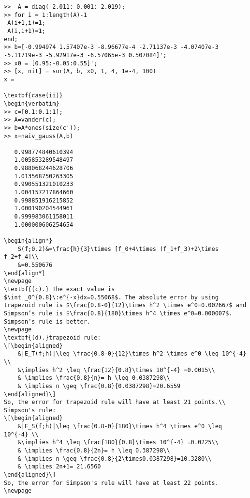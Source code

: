 \begin{verbatim}
>>  A = diag(-2.011:-0.001:-2.019);
>> for i = 1:length(A)-1
 A(i+1,i)=1;
 A(i,i+1)=1;
end;
>> b=[-0.994974 1.57407e-3 -8.96677e-4 -2.71137e-3 -4.07407e-3 -5.11719e-3 -5.92917e-3 -6.57065e-3 0.507084]';
>> x0 = [0.95:-0.05:0.55]';
>> [x, nit] = sor(A, b, x0, 1, 4, 1e-4, 100)
x =

\textbf{case(ii)}
\begin{verbatim}
>> c=[0.1:0.1:1];
>> A=vander(c);
>> b=A*ones(size(c'));
>> x=naiv_gauss(A,b)

   0.998774840610394
   1.005853289548497
   0.988068244628706
   1.013568750263305
   0.990551321010233
   1.004157217864660
   0.998851916215852
   1.000190204544961
   0.999983061158011
   1.000000606254654

\begin{align*}
    S(f;0.2)&=\frac{h}{3}\times [f_0+4\times (f_1+f_3)+2\times f_2+f_4]\\
    &=0.550676
\end{align*}
\newpage
\textbf{(c).} The exact value is 
$\int _0^{0.8}\:e^{-x}dx=0.55068$. The absolute error by using
trapezoid rule is $\frac{0.8-0}{12}\times h^2 \times e^0=0.002667$ and Simpson’s rule is $\frac{0.8}{180}\times h^4 \times e^0=0.000007$. Simpson’s rule is better.
\newpage
\textbf{(d).}trapezoid rule:
\[\begin{aligned}
    &|E_T(f;h)|\leq \frac{0.8-0}{12}\times h^2 \times e^0 \leq 10^{-4} \\
    &\implies h^2 \leq \frac{12}{0.8}\times 10^{-4} =0.0015\\
    & \implies \frac{0.8}{n}= h \leq 0.0387298\\
    & \implies n \geq \frac{0.8}{0.0387298}=20.6559
\end{aligned}\]
So, the error for trapezoid rule will have at least 21 points.\\
Simpson's rule:
\[\begin{aligned}
    &|E_S(f;h)|\leq \frac{0.8-0}{180}\times h^4 \times e^0 \leq 10^{-4} \\
    &\implies h^4 \leq \frac{180}{0.8}\times 10^{-4} =0.0225\\
    & \implies \frac{0.8}{2n}= h \leq 0.387298\\
    & \implies n \geq \frac{0.8}{2\times0.0387298}=10.3280\\
    & \implies 2n+1= 21.6560
\end{aligned}\]
So, the error for Simpson's rule will have at least 22 points.
\newpage

\end{verbatim}

